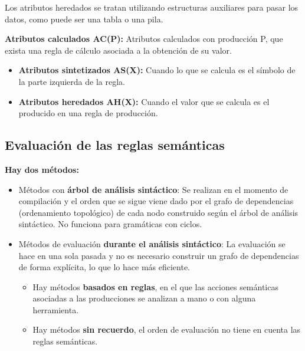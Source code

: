 \documentclass[12pt, twoside, openright]{report} %
\begin{document}
Los atributos heredados se tratan utilizando estructuras auxiliares para pasar los datos, como puede ser una tabla o una pila.

\textbf{Atributos calculados AC(P):} Atributos calculados con producción P, que exista una regla de cálculo asociada a la obtención de su valor.
\begin{itemize}
	\item \textbf{Atributos sintetizados AS(X):} Cuando lo que se calcula es el símbolo de la parte izquierda de la regla.
	\item \textbf{Atributos heredados AH(X):} Cuando el valor que se calcula es el producido en una regla de producción.
\end{itemize}
\pagebreak
\subsection{Evaluación de las reglas semánticas}
\textbf{Hay dos métodos:}
\begin{itemize}
	\item Métodos con \textbf{árbol de análisis sintáctico}: Se realizan en el momento de compilación y el orden que se sigue viene dado por el grafo de dependencias (ordenamiento topológico) de cada nodo construido según el árbol de análisis sintáctico. No funciona para gramáticas con ciclos.
	\item Métodos de evaluación \textbf{durante el análisis sintáctico}: La evaluación se hace en una sola pasada y no es necesario construir un grafo de dependencias de forma explícita, lo que lo hace más eficiente.
	      \begin{itemize}
		      \item Hay métodos \textbf{basados en reglas}, en el que las acciones semánticas asociadas a las producciones se analizan a mano o con alguna herramienta.
		      \item Hay métodos \textbf{sin recuerdo}, el orden de evaluación no tiene en cuenta las reglas semánticas.
	      \end{itemize}
\end{itemize}
\end{document}
